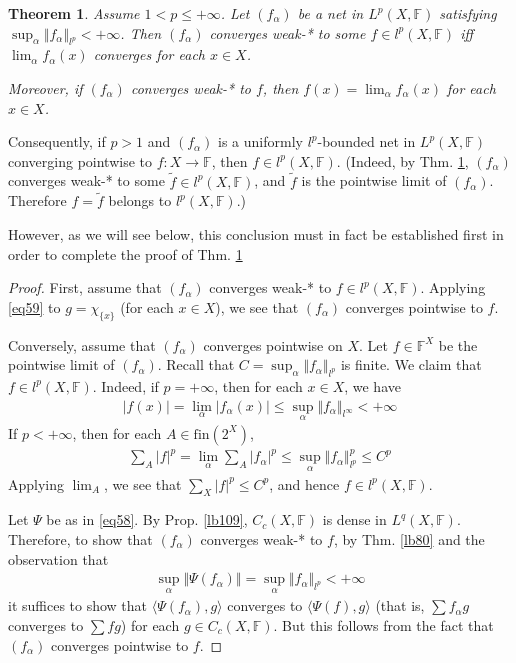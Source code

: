 \documentclass[12pt,b5paper,notitlepage]{article}
\theoremstyle{definition}
\theoremstyle{plain}
\newtheorem{thm}[df]{Theorem}
\newcommand{\wtd}{\widetilde}
\newcommand{\bk}[1]{\langle {#1}\rangle}
\newcommand{\fin}{\mathrm{fin}}
\newcommand{\Fbb}{\mathbb F}
\numberwithin{equation}{section}
\begin{document}
\begin{thm}\label{lb111}
Assume $1<p\leq+\infty$. Let $(f_\alpha)$ be a net in $L^p(X,\Fbb)$ satisfying $\sup_\alpha\Vert f_\alpha\Vert_{l^p}<+\infty$. Then $(f_\alpha)$ converges weak-* to some $f\in l^p(X,\Fbb)$ iff $\lim_\alpha f_\alpha(x)$ converges for each $x\in X$. 

Moreover, if $(f_\alpha)$ converges weak-* to $f$, then $f(x)=\lim_\alpha f_\alpha(x)$ for each $x\in X$.
\end{thm}

Consequently, if $p>1$ and $(f_\alpha)$ is a uniformly $l^p$-bounded net in $L^p(X,\Fbb)$ converging pointwise to $f:X\rightarrow\Fbb$, then $f\in l^p(X,\Fbb)$. (Indeed, by Thm. \ref{lb111}, $(f_\alpha)$ converges weak-* to some $\wtd f\in l^p(X,\Fbb)$, and $\wtd f$ is the pointwise limit of $(f_\alpha)$. Therefore $f=\wtd f$ belongs to $l^p(X,\Fbb)$.) 

However, as we will see below, this conclusion must in fact be established first in order to complete the proof of  Thm. \ref{lb111}


\begin{proof}
First, assume that $(f_\alpha)$ converges weak-* to $f\in l^p(X,\Fbb)$. Applying \eqref{eq59} to $g=\chi_{\{x\}}$ (for each $x\in X$), we see that $(f_\alpha)$ converges pointwise to $f$.

Conversely, assume that $(f_\alpha)$ converges pointwise on $X$. Let $f\in\Fbb^X$ be the pointwise limit of $(f_\alpha)$. Recall that $C=\sup_\alpha\Vert f_\alpha\Vert_{l^p}$ is finite. We claim that $f\in l^p(X,\Fbb)$. Indeed, if $p=+\infty$, then for each $x\in X$, we have
\begin{align*}
|f(x)|=\lim_\alpha|f_\alpha(x)|\leq\sup_\alpha \Vert f_\alpha\Vert_{l^\infty}<+\infty
\end{align*}
If $p<+\infty$, then for each $A\in\fin(2^X)$, 
\begin{align*}
\sum_A |f|^p=\lim_\alpha\sum_A |f_\alpha|^p\leq\sup_\alpha \Vert f_\alpha\Vert^p_{l^p}\leq C^p 
\end{align*}
Applying $\lim_A$, we see that $\sum_X|f|^p\leq C^p$, and hence $f\in l^p(X,\Fbb)$.

Let $\Psi$ be as in \eqref{eq58}. By Prop. \ref{lb109}, $C_c(X,\Fbb)$ is dense in $L^q(X,\Fbb)$. Therefore, to show that $(f_\alpha)$ converges weak-* to $f$, by Thm. \ref{lb80} and the observation that
\begin{align*}
\sup_\alpha\Vert\Psi(f_\alpha)\Vert=\sup_\alpha\Vert f_\alpha\Vert_{l^p}<+\infty
\end{align*}
it suffices to show that $\bk{\Psi(f_\alpha),g}$ converges to $\bk{\Psi(f),g}$ (that is, $\sum f_\alpha g$ converges to $\sum fg$) for each $g\in C_c(X,\Fbb)$. But this follows from the fact that $(f_\alpha)$ converges pointwise to $f$.
\end{proof}
\end{document}
